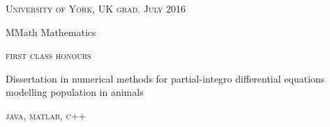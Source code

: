 {\raggedright
  \textsc{\small{University of York, UK
    \hfill
    {\raggedleft
      grad. July 2016
    }
  }}

  {\raggedright\large {
    MMath Mathematics
  } \\}

  \textsc{\small{first class honours}}

  \normalsize{
    Dissertation in numerical methods for partial-integro differential equations modelling population in animals
  }

  \textsc{\small{\color{highlight}
    java, matlab, c++
  }}

  \vspace{8pt}
}
